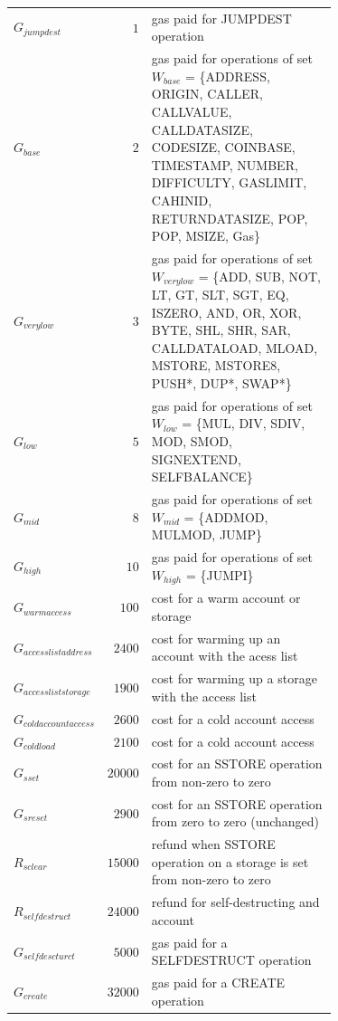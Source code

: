 \documentclass{article}
\begin{document}
\begin{itemize}
\begin{itemize}
\begin{table}[ht!]
\begin{center}
\begin{tabular}{l r p{0.71\linewidth}}
                    $G_{jumpdest}$ & $1$ & gas paid for JUMPDEST operation \\
                    $G_{base}$ & $2$ & gas paid for operations of set $W_{base}$ = \{ADDRESS, ORIGIN, CALLER, CALLVALUE, CALLDATASIZE, CODESIZE, COINBASE, TIMESTAMP, NUMBER, DIFFICULTY, GASLIMIT, CAHINID, RETURNDATASIZE, POP, POP, MSIZE, Gas\} \\
                    $G_{verylow}$ & $3$ & gas paid for operations of set $W_{verylow}$ = \{ADD, SUB, NOT, LT, GT, SLT, SGT, EQ, ISZERO, AND, OR, XOR, BYTE, SHL, SHR, SAR, CALLDATALOAD, MLOAD, MSTORE, MSTORE8, PUSH*, DUP*, SWAP*\} \\
                    $G_{low}$ & $5$ & gas paid for operations of set $W_{low}$ = \{MUL, DIV, SDIV, MOD, SMOD, SIGNEXTEND, SELFBALANCE\} \\ 
                    $G_{mid}$ & $8$ & gas paid for operations of set $W_{mid}$ = \{ADDMOD, MULMOD, JUMP\} \\
                    $G_{high}$ & $10$ & gas paid for operations of set $W_{high}$ = \{JUMPI\} \\
                    $G_{warmaccess}$ & $100$ & cost for a warm account or storage \\
                    $G_{accesslistaddress}$ & $2400$ & cost for warming up an account with the acess list \\
                    $G_{accessliststorage}$ & $1900$ & cost for warming up a storage with the access list \\
                    $G_{coldaccountaccess}$ & $2600$ & cost for a cold account access \\
                    $G_{coldload}$ & $2100$ & cost for a cold account access \\
                    $G_{sset}$ & $20000$ & cost for an SSTORE operation from non-zero to zero \\
                    $G_{sreset}$ & $2900$ & cost for an SSTORE operation from zero to zero (unchanged) \\
                    $R_{sclear}$ & $15000$ & refund when SSTORE operation on a storage is set from non-zero to zero \\
                    $R_{selfdestruct}$ & $24000$ & refund for self-destructing and account \\
                    $G_{selfdescturct}$ & $5000$ & gas paid for a SELFDESTRUCT operation \\
                    $G_{create}$ & $32000$ & gas paid for a CREATE operation \\

\end{tabular}
\end{center}
\end{table}
\end{itemize}
\end{itemize}
\end{document}
